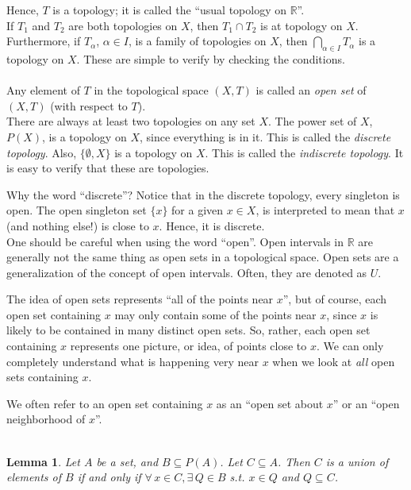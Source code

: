 \documentclass[12pt]{report}
\newcommand{\example}{  \noindent{\sc Example }\hspace{5pt} }
\newcommand{\define}{  \noindent{\sc Definition }\hspace{5pt} }
\newcommand{\claim}{ \noindent{\sc Claim }\hspace{5pt} }
\newcommand{\intover}[2]{\bigcap_{#1 \in #2}}
\newcommand{\reals}{\mathbb{R}}
\newtheorem{lemma}[theorem]{Lemma}
\begin{document}
Hence, $T$ is a topology; it is called the ``usual topology on $\reals$''. \\

\claim If $T_1$ and $T_2$ are both topologies on $X$, then $T_1 \cap T_2$ is
at topology on $X$. Furthermore, if $T_\alpha$, $\alpha \in I$, is a family of
topologies on $X$, then $\intover{\alpha}{I}T_{\alpha}$ is a topology on
$X$. These are simple to verify by checking the conditions.\\
\\

\define Any element of $T$ in the topological space $(X,T)$ is called an
{\em open set} of $(X,T)$ (with respect to $T$).
\\

\example There are always at least two topologies on any set $X$. The power
set of $X$, $P(X)$, is a topology on $X$, since everything is in it. This is
called the  {\em discrete topology}. Also,
$\{\emptyset, X\}$ is a topology on $X$. This is called the
 {\em indiscrete topology}. It is easy to verify
that these are topologies.

Why the word ``discrete''? Notice that in the discrete topology, every
singleton is open. The open singleton set $\{x\}$ for a given $x \in X$,
is interpreted to mean that $x$ (and nothing else!) is close to $x$. Hence, it
is discrete. \\

One should be careful when using the word ``open''. Open intervals in
$\reals$ are generally not the same thing as open sets in a topological
space. Open sets are a generalization of the concept of open intervals. Often,
they are denoted as $U$.

The idea of open sets represents ``all of the points near $x$'', but of
course, each open set containing $x$ may only contain some of the points near
$x$, since $x$ is likely to be contained in many distinct open sets. So,
rather, each open set containing $x$ represents one picture, or idea, of
points close to $x$.  We can only completely understand what is happening very
near $x$ when we look at {\em all} open sets containing $x$. 

We often refer to an open set containing $x$ as an ``open set about $x$'' or
an ``open neighborhood of $x$''.\\
\\
\begin{lemma}\label{unionlemma}
Let $A$ be a set, and $B \subseteq P(A)$. Let $C \subseteq A$. Then $C$ is a
union of elements of $B$ if and only if $\forall\, x \in C, \exists\, Q \in B$
s.t. $x \in Q$ and $Q \subseteq C$.
\end{lemma}
\end{document}
